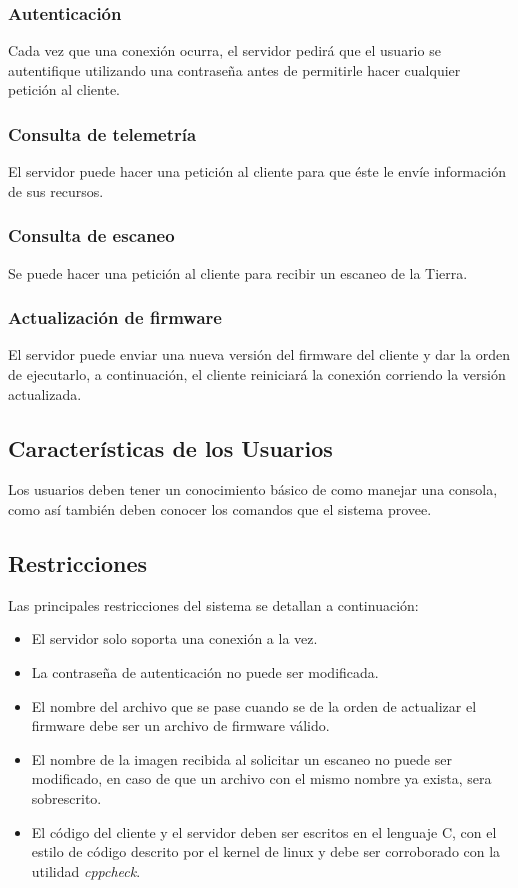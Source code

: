 \documentclass[11pt]{unc_so2}
\begin{document}
\subsubsection{Autenticación}
Cada vez que una conexión ocurra, el servidor pedirá que el usuario se
autentifique utilizando una contraseña antes de permitirle hacer cualquier
petición al cliente.


\subsubsection{Consulta de telemetría}
El servidor puede hacer una petición al cliente para que éste le envíe
información de sus recursos.

\subsubsection{Consulta de escaneo}
Se puede hacer una petición al cliente para recibir un escaneo de la Tierra.

\subsubsection{Actualización de firmware}
El servidor puede enviar una nueva versión del firmware del cliente y dar la
orden de ejecutarlo, a continuación, el cliente reiniciará la conexión corriendo
la versión actualizada.

\subsection{Características de los Usuarios}
Los usuarios deben tener un conocimiento básico de como manejar una consola,
como así también deben conocer los comandos que el sistema provee.

\subsection{Restricciones}
Las principales restricciones del sistema se detallan a continuación:

\begin{itemize}
  \item El servidor solo soporta una conexión a la vez.
  \item La contraseña de autenticación no puede ser modificada.
  \item El nombre del archivo que se pase cuando se de la orden de actualizar el firmware
    debe ser un archivo de firmware válido.
  \item El nombre de la imagen recibida al solicitar un escaneo no puede ser
    modificado, en caso de que un archivo con el mismo nombre ya exista, sera sobrescrito.
  \item El código del cliente y el servidor deben ser escritos en el lenguaje C,
    con el estilo de código descrito por el kernel de linux y debe ser
    corroborado con la utilidad \textit{cppcheck}.
\end{itemize}
\end{document}
